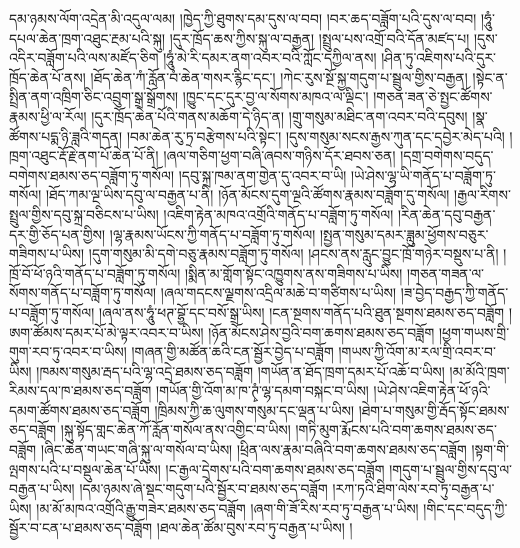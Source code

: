 དམ་ཉམས་ལོག་འདྲེན་མི་འདུལ་ལམ། །ཁྱེད་ཀྱི་ཐུགས་དམ་དུས་ལ་བབ། །བར་ཆད་བཟློག་པའི་དུས་ལ་བབ། །ཧཱུཾ་དཔལ་ཆེན་ཁྲག་འཐུང་རྔམ་པའི་སྐུ། །དུར་ཁྲོད་ཆས་ཀྱིས་སྐུ་ལ་བརྒྱན། །སྤྲུལ་པས་འགྲོ་བའི་དོན་མཛད་པ། །དུས་འདིར་བཟློག་པའི་ལས་མཛོད་ཅིག །ཧཱུཾ་མེ་རི་དམར་ནག་འབར་བའི་ཀློང་དཀྱིལ་ནས། །ཤིན་ཏུ་འཇིགས་པའི་དུར་ཁྲོད་ཆེན་པོ་ནས། །ཐོད་ཆེན་ཀཾ་རློན་བཾ་ཆེན་གསར་རྙིང་དང་། །ཀེང་རུས་སྔོ་སྐྱ་གདུག་པ་སྦྲུལ་གྱིས་བརྒྱན། །སྟེང་ན་སྤྲིན་ནག་འཁྲིག་ཅིང་འབྲུག་སྒྲ་སྒྲོགས། །ཁྱུང་དང་དུར་བྱ་ལ་སོགས་མཁའ་ལ་ལྡིང་། །གཅན་ཟན་ཅེ་སྤྱང་ཚོགས་རྣམས་ཕྱི་ལ་རོལ། །དུར་ཁྲོད་ཆེན་པོའི་གནས་མཆོག་དེ་ཉིད་ན། །གྲུ་གསུམ་མཐིང་ནག་འབར་བའི་དབུས། །སྣ་ཚོགས་པདྨ་ཉི་ཟླའི་གདན། །བམ་ཆེན་རུ་ཏྲ་བརྩེགས་པའི་སྟེང་། །དུས་གསུམ་སངས་རྒྱས་ཀུན་དང་དབྱེར་མེད་པའི། །ཁྲག་འཐུང་རྡོ་རྗེ་ནག་པོ་ཆེན་པོ་ནི། །ཞལ་གཅིག་ཕྱག་བཞི་ཞབས་གཉིས་དོར་ཐབས་ཅན། །དགྲ་བགེགས་བདུད་བགེགས་ཐམས་ཅད་བཟློག་ཏུ་གསོལ། །དབུ་སྐྲ་ཁམ་ནག་གྱེན་དུ་འབར་བ་ཡི། །ཡེ་ཤེས་ལྷ་ཡི་གནོད་པ་བཟློག་ཏུ་གསོལ། །ཐོད་ཀམ་ལྔ་ཡིས་དབུ་ལ་བརྒྱན་པ་ནི། །ཉོན་མོངས་དུག་ལྔའི་ཚོགས་རྣམས་བཟློག་དུ་གསོལ། །རྒྱལ་རིགས་སྤྲུལ་གྱིས་དབུ་སྐྲ་བཅིངས་པ་ཡིས། །འཇིག་རྟེན་མཁའ་འགྲོའི་གནོད་པ་བཟློག་ཏུ་གསོལ། །རིན་ཆེན་དབུ་བརྒྱན་དར་གྱི་ཅོད་པན་གྱིས། །ལྷ་རྣམས་ཡོངས་ཀྱི་གནོད་པ་བཟློག་ཏུ་གསོལ། །སྤྱན་གསུམ་དམར་ཟླུམ་ཕྱོགས་བཅུར་གཟིགས་པ་ཡིས། །དུག་གསུམ་མི་དགེ་བཅུ་རྣམས་བཟློག་ཏུ་གསོལ། །ཤངས་ནས་རླུང་བྱུང་ཁྲོ་གཉེར་བསྡུས་པ་ནི། །ཁྲོ་བོ་ཕོ་ཉའི་གནོད་པ་བཟློག་ཏུ་གསོལ། །སྨིན་མ་གློག་སྟོང་འཁྱུགས་ནས་གཟིགས་པ་ཡིས། །གཅན་གཟན་ལ་སོགས་གནོད་པ་བཟློག་ཏུ་གསོལ། །ཞལ་གདངས་ལྗགས་འདྲིལ་མཆེ་བ་གཙིགས་པ་ཡིས། །ཟ་བྱེད་བརྒྱད་ཀྱི་གནོད་པ་བཟློག་ཏུ་གསོལ། །ཞལ་ནས་ཧཱུཾ་ཕཊ་བྷྱོ་དང་བསོ་སྒྲ་ཡིས། །ངན་སྔགས་གནོད་པའི་ཐུན་སྔགས་ཐམས་ཅད་བཟློག །ཨག་ཚོམས་དམར་པོ་མེ་ལྟར་འབར་བ་ཡིས། །ཉོན་མོངས་ཤེས་བྱའི་བག་ཆགས་ཐམས་ཅད་བཟློག །ཕྱག་གཡས་གྲི་གུག་རབ་ཏུ་འབར་བ་ཡིས། །གཞན་གྱི་མཚོན་ཆའི་ངན་སྦྱོར་བྱེད་པ་བཟློག །གཡས་ཀྱི་འོག་མ་རལ་གྲི་འབར་བ་ཡིས། །ཁམས་གསུམ་རྦད་པའི་ལྷ་འདྲེ་ཐམས་ཅད་བཟློག །གཡོན་ན་ཐོད་ཁྲག་དམར་པོ་འཆོ་བ་ཡིས། །མ་མོའི་ཁྲག་རིམས་དལ་ཁ་ཐམས་ཅད་བཟློག །གཡོན་གྱི་འོག་མ་ཁ་ཊྭཾ་ལྷ་དམག་བསྐང་བ་ཡིས། །ཡེ་ཤེས་འཇིག་རྟེན་ཕོ་ཉའི་དམག་ཚོགས་ཐམས་ཅད་བཟློག །ཁྲིམས་ཀྱི་ཆ་ལུགས་གསུམ་དང་ལྡན་པ་ཡིས། །ཐེག་པ་གསུམ་གྱི་རྦོད་སྟོང་ཐམས་ཅད་བཟློག །སྐུ་སྟོད་གླང་ཆེན་ཀོ་རློན་གསོལ་ནས་འགྱིང་བ་ཡིས། །གཏི་མུག་རྨོངས་པའི་བག་ཆགས་ཐམས་ཅད་བཟློག །ཞིང་ཆེན་གཡང་གཞི་སྐུ་ལ་གསོལ་བ་ཡིས། །ཕྲིན་ལས་རྣམ་བཞིའི་བག་ཆགས་ཐམས་ཅད་བཟློག །སྟག་གི་ལྤགས་པའི་པ་བསྡུལ་ཆེན་པོ་ཡིས། །ང་རྒྱལ་དྲེགས་པའི་བག་ཆགས་ཐམས་ཅད་བཟློག །གདུག་པ་སྦྲུལ་གྱིས་དབུ་ལ་བརྒྱན་པ་ཡིས། །དམ་ཉམས་ཞེ་སྡང་གདུག་པའི་སྦྱོར་བ་ཐམས་ཅད་བཟློག །རཀ་ཏའི་ཐིག་ལེས་རབ་ཏུ་བརྒྱན་པ་ཡིས། །མ་མོ་མཁའ་འགྲོའི་རྒྱུ་གཟེར་ཐམས་ཅད་བཟློག །ཞག་གི་ཟོ་རིས་རབ་ཏུ་བརྒྱན་པ་ཡིས། །གིང་དང་བདུད་ཀྱི་སྦྱོར་བ་ངན་པ་ཐམས་ཅད་བཟློག །ཐལ་ཆེན་ཚོམ་བུས་རབ་ཏུ་བརྒྱན་པ་ཡིས། །
